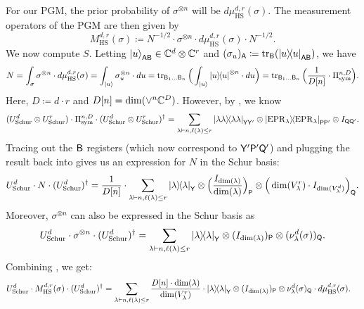 For our PGM, the prior probability of $\sigma^{\otimes n}$ will be $d\mu^{d,r}_{\mathrm{HS}}(\sigma)$. The measurement operators of the PGM are then given by
\begin{equation}\label{eq:M_HS_start}
    M^{d,r}_{\mathrm{HS}} (\sigma) \coloneq N^{-1/2} \cdot \sigma^{\otimes n} \cdot d\mu^{d,r}_{\mathrm{HS}}(\sigma) \cdot N^{-1/2}.
\end{equation}
We now compute $S$. Letting $\ket{u}_{\mathsf{A}\mathsf{B}} \in \mathbb C^d \otimes \mathbb C^r$ and $(\sigma_u)_{\mathsf{A}} \coloneq \tr_{\mathsf{B}}(\ketbra{u}_{\mathsf{A}\mathsf{B}})$, we have
\begin{equation}\label{eq:S_intermediate}
    N = \int_{\sigma} \sigma^{\otimes n} \cdot d\mu^{d,r}_{\mathrm{HS}}(\sigma) = \int_{\ket{u}} \sigma_u^{\otimes n} \cdot du = \tr_{\mathsf{B}_1\dots\mathsf{B}_n} \Big( \int_{\ket{u}} \ketbra{u}^{\otimes n} \cdot du \Big) = \tr_{\mathsf{B}_1\dots\mathsf{B}_n} \Big( \frac{1}{D[n]} \cdot \Pi_{\mathrm{sym}}^{n,D} \Big).
\end{equation}
Here, $D \coloneq d \cdot r$ and $D[n]=\dim(\vee^n \mathbb C^{D})$. However, by , we know
\begin{equation*}
        (U_{\mathrm{Schur}}^d \otimes U_{\mathrm{Schur}}^r) \cdot \Pi_{\mathrm{sym}}^{n, D} \cdot (U_{\mathrm{Schur}}^d \otimes U_{\mathrm{Schur}}^r)^\dagger
        = \sum_{\lambda \vdash n, \ell(\lambda) \leq r} \ketbra{\lambda\lambda}{\lambda\lambda}_{\mathsf{Y}\mathsf{Y'}} \otimes \ketbra{\mathrm{EPR}_{\lambda}}{\mathrm{EPR}_{\lambda}}_{\mathsf{P}\mathsf{P'}} \otimes I_{\mathsf{Q}\mathsf{Q'}}.
    \end{equation*}
Tracing out the $\mathsf{B}$ registers (which now correspond to $\mathsf{Y}'\mathsf{P}'\mathsf{Q}'$) and plugging the result back into  gives us an expression for $N$ in the Schur basis:
\begin{equation}\label{eq:S_in_Schur}
    U_{\mathrm{Schur}}^d \cdot N \cdot (U_{\mathrm{Schur}}^{d})^{\dagger} = \frac{1}{D[n]} \cdot \sum_{\lambda \vdash n, \ell(\lambda) \leq r} \ketbra{\lambda}_{\mathsf{Y}} \otimes \Big( \frac{I_{\dim(\lambda)}}{\dim(\lambda)}\Big)_{\mathsf{P}} \otimes \Big( \dim(V^r_\lambda) \cdot I_{\dim(V^d_\lambda)} \Big)_{\mathsf{Q}}.
\end{equation}
Moreover, $\sigma^{\otimes n}$ can also be expressed in the Schur basis as
\begin{equation}\label{eq:sigma_in_Schur}
    U_{\mathrm{Schur}}^d \cdot \sigma^{\otimes n} \cdot (U_{\mathrm{Schur}}^d)^{\dagger} = \sum_{\lambda \vdash n, \ell(\lambda) \leq r} \ketbra{\lambda}_{\mathsf{Y}} \otimes (I_{\dim(\lambda)})_{\mathsf{P}} \otimes (\nu^d_\lambda(\sigma))_{\mathsf{Q}}.
\end{equation}
Combining , we get:
\begin{align}\label{eq:M_HS_in_Schur}
U_{\mathrm{Schur}}^d \cdot M_{\mathrm{HS}}^{d,r}(\sigma) \cdot (U_{\mathrm{Schur}}^d)^\dagger & = \sum_{\lambda \vdash n, \ell(\lambda) \leq r} \frac{D[n] \cdot \dim(\lambda)}{\dim(V^r_\lambda)} \cdot \ketbra{\lambda}_{\mathsf{Y}} \otimes (I_{\dim(\lambda)})_{\mathsf{P}} \otimes \nu^d_\lambda(\sigma)_{\mathsf{Q}} \cdot d\mu_{\mathrm{HS}}^{d,r}(\sigma).
\end{align}

